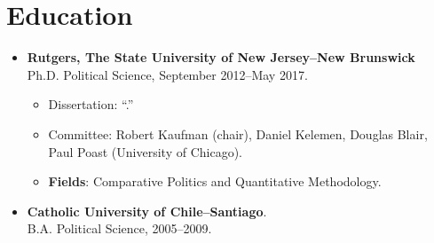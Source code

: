 \section*{Education}

\begin{itemize}
  \item {\bf Rutgers, The State University of New Jersey--New Brunswick}\\
  Ph.D. Political Science, September 2012--May 2017.
    	\begin{itemize}
      		\item[] Dissertation: ``{\unskip}.''
      		\item[] Committee: Robert Kaufman (chair), Daniel Kelemen, Douglas Blair, Paul Poast (University of Chicago).
          \item[] {\bf Fields}: Comparative Politics and Quantitative Methodology.
		  \end{itemize}

\item {\bf Catholic University of Chile--Santiago}.\\
B.A. Political Science, 2005--2009.
\end{itemize}
